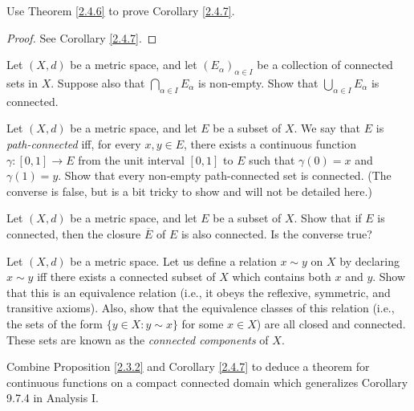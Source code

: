 \begin{exercise}\label{ex 2.4.5}
    Use Theorem \ref{2.4.6} to prove Corollary \ref{2.4.7}.
\end{exercise}

\begin{proof}
    See Corollary \ref{2.4.7}.
\end{proof}

\begin{exercise}\label{ex 2.4.6}
    Let \((X, d)\) be a metric space, and let \((E_\alpha)_{\alpha \in I}\) be a collection of connected sets in \(X\).
    Suppose also that \(\bigcap_{\alpha \in I} E_\alpha\) is non-empty.
    Show that \(\bigcup_{\alpha \in I} E_\alpha\) is connected.
\end{exercise}

\begin{exercise}\label{ex 2.4.7}
    Let \((X, d)\) be a metric space, and let \(E\) be a subset of \(X\).
    We say that \(E\) is \emph{path-connected} iff, for every \(x, y \in E\), there exists a continuous function \(\gamma : [0, 1] \to E\) from the unit interval \([0, 1]\) to \(E\) such that \(\gamma(0) = x\) and \(\gamma(1) = y\).
    Show that every non-empty path-connected set is connected.
    (The converse is false, but is a bit tricky to show and will not be detailed here.)
\end{exercise}

\begin{exercise}\label{ex 2.4.8}
    Let \((X, d)\) be a metric space, and let \(E\) be a subset of \(X\).
    Show that if \(E\) is connected, then the closure \(\overline{E}\) of \(E\) is also connected.
    Is the converse true?
\end{exercise}

\begin{exercise}\label{ex 2.4.9}
    Let \((X, d)\) be a metric space. Let us define a relation \(x \sim y\) on \(X\) by declaring \(x \sim y\) iff there exists a connected subset of \(X\) which contains both \(x\) and \(y\).
    Show that this is an equivalence relation (i.e., it obeys the reflexive, symmetric, and transitive axioms).
    Also, show that the equivalence classes of this relation (i.e., the sets of the form \(\{y \in  X : y \sim x\}\) for some \(x \in X\)) are all closed and connected.
    These sets are known as the \emph{connected components} of \(X\).
\end{exercise}

\begin{exercise}\label{ex 2.4.10}
    Combine Proposition \ref{2.3.2} and Corollary \ref{2.4.7} to deduce a theorem for continuous functions on a compact connected domain which generalizes Corollary 9.7.4 in Analysis I.
\end{exercise}